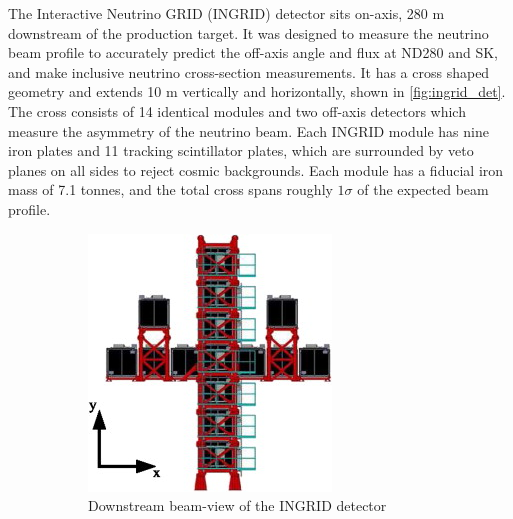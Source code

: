 The Interactive Neutrino GRID (INGRID) detector sits on-axis, 280 m downstream of the production target. It was designed to measure the neutrino beam profile to accurately predict the off-axis angle and flux at ND280 and SK, and make inclusive neutrino cross-section measurements\cite{t2k_ingrid_xsec}. It has a cross shaped geometry and extends 10 m vertically and horizontally, shown in \autoref{fig:ingrid_det}. The cross consists of 14 identical modules and two off-axis detectors which measure the asymmetry of the neutrino beam. Each INGRID module has nine iron plates and 11 tracking scintillator plates, which are surrounded by veto planes on all sides to reject cosmic backgrounds\cite{t2k_ingrid}. Each module has a fiducial iron mass of 7.1 tonnes, and the total cross spans roughly $1\sigma$ of the expected beam profile.
\begin{figure}[h]
	\begin{subfigure}[t]{0.47\textwidth}
		\includegraphics[width=\textwidth, trim={0mm 0mm 0mm 0mm}, clip,page=1]{figures/det_chap/ingrid/ingrid}
		\caption{Downstream beam-view of the INGRID detector}
	\end{subfigure}	
	\begin{subfigure}[t]{0.47\textwidth}

\end{subfigure}
\end{figure}
